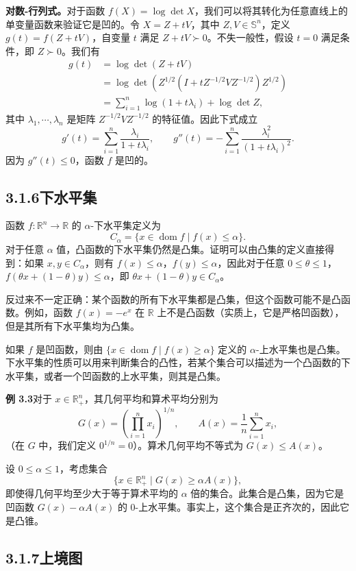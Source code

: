 \documentclass[UTF8, 12pt, fontset=fandol, oneside]{ctexart}
\DeclareMathOperator{\dom}{dom}
\begin{document}
\noindent\textbf{对数-行列式。}\quad 对于函数 $f(X)=\log\det X$，我们可以将其转化为任意直线上的单变量函数来验证它是凹的。令 $X=Z+tV$，其中 $Z,V\in\mathbb{S}^n$，定义 $g(t)=f(Z+tV)$，自变量 $t$ 满足 $Z+tV\succ0$。不失一般性，假设 $t=0$ 满足条件，即 $Z\succ0$。我们有
\[
\begin{aligned}
g(t)&=\log\det(Z+tV)\\
&=\log\det\left(Z^{1/2}(I+tZ^{-1/2}VZ^{-1/2})Z^{1/2}\right)\\
&=\sum_{i=1}^n\log(1+t\lambda_i)+\log\det Z,
\end{aligned}
\]
其中 $\lambda_1,\cdots,\lambda_n$ 是矩阵 $Z^{-1/2}VZ^{-1/2}$ 的特征值。因此下式成立
\[
g'(t)=\sum_{i=1}^n\frac{\lambda_i}{1+t\lambda_i},\qquad
g''(t)=-\sum_{i=1}^n\frac{\lambda_i^2}{(1+t\lambda_i)^2}.
\]
因为 $g''(t)\leq0$，函数 $f$ 是凹的。

\subsection*{3.1.6\quad 下水平集}

函数 $f:\mathbb{R}^n\to\mathbb{R}$ 的 $\alpha$-下水平集定义为
\[
C_\alpha=\{x\in\dom f\mid f(x)\leq\alpha\}.
\]
对于任意 $\alpha$ 值，凸函数的下水平集仍然是凸集。证明可以由凸集的定义直接得到：如果 $x,y\in C_\alpha$，则有 $f(x)\leq\alpha$，$f(y)\leq\alpha$，因此对于任意 $0\leq\theta\leq1$，$f(\theta x+(1-\theta)y)\leq\alpha$，即 $\theta x+(1-\theta)y\in C_\alpha$。

反过来不一定正确：某个函数的所有下水平集都是凸集，但这个函数可能不是凸函数。例如，函数 $f(x)=-e^x$ 在 $\mathbb{R}$ 上不是凸函数（实质上，它是严格凹函数），但是其所有下水平集均为凸集。

如果 $f$ 是凹函数，则由 $\{x\in\dom f\mid f(x)\geq\alpha\}$ 定义的 $\alpha$-上水平集也是凸集。下水平集的性质可以用来判断集合的凸性，若某个集合可以描述为一个凸函数的下水平集，或者一个凹函数的上水平集，则其是凸集。

\noindent\textbf{例 3.3}\quad 对于 $x\in\mathbb{R}_+^n$，其几何平均和算术平均分别为
\[
G(x)=\left(\prod_{i=1}^n x_i\right)^{1/n},\qquad
A(x)=\frac{1}{n}\sum_{i=1}^n x_i,
\]
（在 $G$ 中，我们定义 $0^{1/n}=0$）。算术几何平均不等式为 $G(x)\leq A(x)$。

设 $0\leq\alpha\leq1$，考虑集合
\[
\{x\in\mathbb{R}_+^n\mid G(x)\geq \alpha A(x)\},
\]
即使得几何平均至少大于等于算术平均的 $\alpha$ 倍的集合。此集合是凸集，因为它是凹函数 $G(x)-\alpha A(x)$ 的 $0$-上水平集。事实上，这个集合是正齐次的，因此它是凸锥。

\subsection*{3.1.7\quad 上境图}
\end{document}

